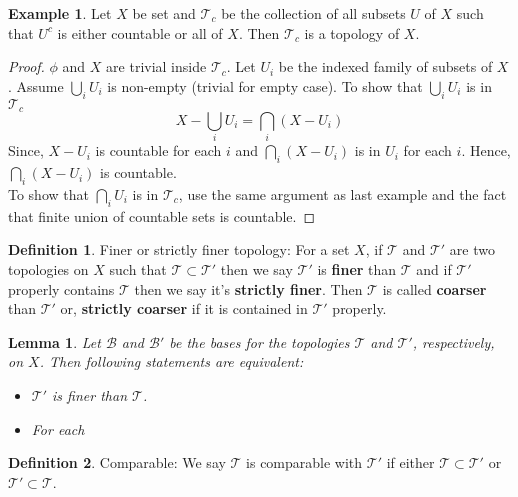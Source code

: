 \documentclass[12pt,reqno]{amsart}
\theoremstyle{plain}
\newtheorem{lem}{Lemma}
\theoremstyle{definition}
\newtheorem{defn}{Definition}
\newtheorem{eg}{Example}
\begin{document}
\begin{eg}
    Let $X$ be set and $\mathcal{T}_c$ be the collection of all subsets $U$ of $X$ such that $U^c$ is either countable or all of $X$. Then $\mathcal{T}_c$ is a topology of $X$. 
\end{eg}
\begin{proof}
    $\phi$ and $X$ are trivial inside $\mathcal{T}_c$. Let $U_i$ be the indexed family of subsets of $X$. Assume $\bigcup\limits_i U_i$ is non-empty (trivial for empty case). To show that $\bigcup\limits_i U_i$ is in $\mathcal{T}_c$
    $$ X - \bigcup\limits_i U_i = \bigcap\limits_i (X - U_i)$$
    Since, $X - U_i$ is countable for each $i$ and $\bigcap\limits_i (X - U_i)$ is in $U_i$ for each $i$. Hence, $\bigcap\limits_i (X - U_i)$ is countable. \\
    To show that $\bigcap\limits_i U_i$ is in $\mathcal{T}_c$, use the same argument as last example and the fact that finite union of countable sets is countable.
\end{proof}
\begin{defn}
    Finer or strictly finer topology: For a set $X$, if $\mathcal{T}$ and $\mathcal{T}'$ are two topologies on $X$ such that $\mathcal{T} \subset \mathcal{T}'$ then we say $\mathcal{T}'$ is {\bf finer} than $\mathcal{T}$ and if $\mathcal{T}'$ properly contains $\mathcal{T}$ then we say it's {\bf strictly finer}. Then $\mathcal{T}$ is called {\bf coarser} than $\mathcal{T}'$ or, {\bf strictly coarser} if it is contained in $\mathcal{T}'$ properly.
\end{defn}
\begin{lem}
    Let $\mathcal{B}$ and $\mathcal{B}'$ be the bases for the topologies $\mathcal{T}$ and $\mathcal{T}'$, respectively, on $X$. Then following statements are equivalent:
    \begin{itemize}
        \item $\mathcal{T}'$ is finer than $\mathcal{T}$.
        \item For each 
    \end{itemize}
\end{lem}
\begin{defn}
    Comparable: We say $\mathcal{T}$ is comparable with $\mathcal{T}'$ if either $\mathcal{T} \subset \mathcal{T}'$ or $\mathcal{T}' \subset \mathcal{T}$.
\end{defn}
\end{document}

